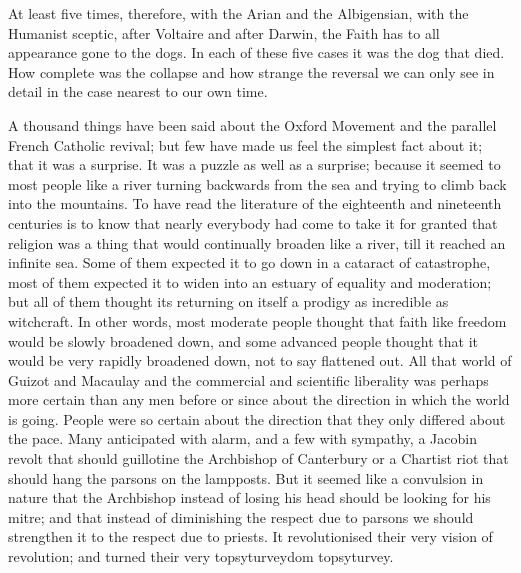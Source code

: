 At least five times, therefore, with the Arian and the Albigensian, with the Humanist sceptic, after Voltaire and after Darwin, the Faith has to all appearance gone to the dogs. In each of these five cases it was the dog that died. How complete was the collapse and how strange the reversal we can only see in detail in the case nearest to our own time.

A thousand things have been said about the Oxford Movement and the parallel French Catholic revival; but few have made us feel the simplest fact about it; that it was a surprise. It was a puzzle as well as a surprise; because it seemed to most people like a river turning backwards from the sea and trying to climb back into the mountains. To have read the literature of the eighteenth and nineteenth centuries is to know that nearly everybody had come to take it for granted that religion was a thing that would continually broaden like a river, till it reached an infinite sea. Some of them expected it to go down in a cataract of catastrophe, most of them expected it to widen into an estuary of equality and moderation; but all of them thought its returning on itself a prodigy as incredible as witchcraft. In other words, most moderate people thought that faith like freedom would be slowly broadened down, and some advanced people thought that it would be very rapidly broadened down, not to say flattened out. All that world of Guizot and Macaulay and the commercial and scientific liberality was perhaps more certain than any men before or since about the direction in which the world is going. People were so certain about the direction that they only differed about the pace. Many anticipated with alarm, and a few with sympathy, a Jacobin revolt that should guillotine the Archbishop of Canterbury or a Chartist riot that should hang the parsons on the lampposts. But it seemed like a convulsion in nature that the Archbishop instead of losing his head should be looking for his mitre; and that instead of diminishing the respect due to parsons we should strengthen it to the respect due to priests. It revolutionised their very vision of revolution; and turned their very topsyturveydom topsyturvey.

